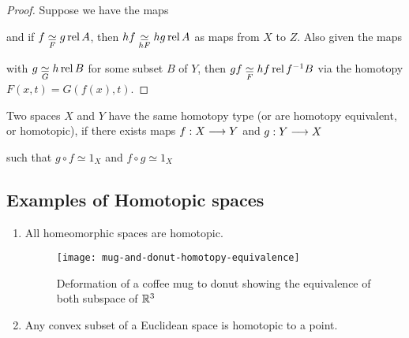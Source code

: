 \begin{proof}
    Suppose we have the maps
    \begin{center}
    \end{center}
    and if $f \underset{F}{\simeq} g \operatorname{rel} A$, then $hf \underset{hF}{\simeq} hg \operatorname{rel} A$ as maps from $X$ to $Z$. Also given the maps
    \begin{center}
    \end{center}
    with $g \underset{G}{\simeq} h \operatorname{rel} B$ for some subset $B$ of $Y$, then $gf \underset{F}{\simeq} hf \operatorname{rel} f^{-1} B$ via the homotopy $F(x,t) = G(f(x), t)$.
\end{proof}

\begin{defn}
Two spaces $X$ and $Y$ have the same homotopy type (or are homotopy equivalent, or homotopic), if there exists maps $f: X \longrightarrow Y$ and $g : Y \longrightarrow X$
\begin{center}
\end{center} 
such that $g \circ f \simeq 1_X$ and $f \circ g \simeq 1_X$
\end{defn}


\subsection*{Examples of Homotopic spaces}
\begin{enumerate}
\item All homeomorphic spaces are homotopic.
\begin{figure}[H]
    \centering
    \texttt{[image: mug-and-donut-homotopy-equivalence]}
    \caption{Deformation of a coffee mug to donut showing the equivalence of both subspace of $\mathbb{R}^3$}
\end{figure}
\item Any convex subset of a Euclidean space is homotopic to a point.
\end{enumerate}

